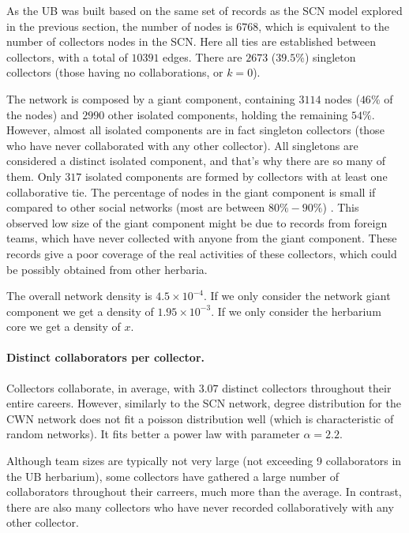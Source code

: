 As the UB was built based on the same set of records as the SCN model explored in the previous section, the number of nodes is $6768$, which is equivalent to the number of collectors nodes in the SCN.
Here all ties are established between collectors, with a total of $10391$ edges.
There are $2673$ ($39.5\%$) singleton collectors (those having no collaborations, or $k=0$).

The network is composed by a giant component, containing $3114$ nodes ($46\%$ of the nodes) and $2990$ other isolated components, holding the remaining $54\%$.
However, almost all isolated components are in fact singleton collectors (those who have never collaborated with any other collector). All singletons are considered a distinct isolated component, and that's why there are so many of them. Only $317$ isolated components are formed by collectors with at least one collaborative tie.
The percentage of nodes in the giant component is small if compared to other social networks (most are between $80\% - 90\%$) \cite{Newman}. This observed low size of the giant component might be due to records from foreign teams, which have never collected with anyone from the giant component. These records give a poor coverage of the real activities of these collectors, which could be possibly obtained from other herbaria.

The overall network density is $4.5 \times 10^{-4}$.
If we only consider the network giant component we get a density of $1.95 \times 10^{-3}$.
If we only consider the herbarium core we get a density of $x$.

\paragraph*{Distinct collaborators per collector.}
Collectors collaborate, in average, with $3.07$ distinct collectors throughout their entire careers.
However, similarly to the SCN network, degree distribution for the CWN network does not fit a poisson distribution well (which is characteristic of random networks). It fits better a power law with parameter $\alpha=2.2$.

Although team sizes are typically not very large (not exceeding 9 collaborators in the UB herbarium), some collectors have gathered a large number of collaborators throughout their carreers, much more than the average. %
In contrast, there are also many collectors who have never recorded collaboratively with any other collector.

